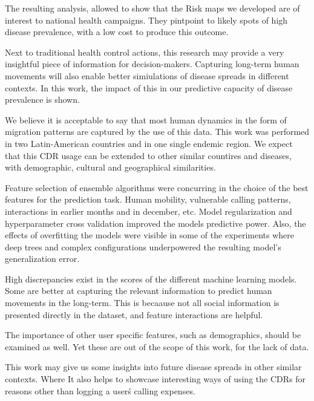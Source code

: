 

The resulting analysis, allowed to show that the Risk maps we developed are of interest to national health campaigns.
They pintpoint to likely spots of high disease prevalence, with a low cost to produce this outcome.

Next to traditional health control actions, this research may provide a very insightful piece of information for decision-makers.
Capturing long-term human movements will also enable better simiulations of disease spreads in different contexts.
In this work, the impact of this in our predictive capacity of disease prevalence is shown.





We believe it is acceptable to say that most human dynamics in the form of migration patterns are captured by the use of this data.
This work was performed in two Latin-American countries and in one single endemic region.
We expect that this CDR usage can be extended to other similar countires and diseases, with demographic, cultural and geographical similarities.


Feature selection of ensemble algorithms were concurring in the choice of the best features for the prediction task.
Human mobility, vulnerable calling patterns, interactions in earlier months and in december, etc.
Model regularization and hyperparameter cross validation improved the models predictive power.
Also, the effects of overfitting the models were visible in some of the experiments where deep trees and complex configurations underpowered the resulting model's generalization error.



High discrepancies exist in the scores of the different machine learning models.
Some are better at capturing the relevant information to predict human movements in the long-term.
This is becaause not all social information is presented directly in the dataset, and feature interactions are helpful.


The importance of other user specific features, such as demographics, should be examined as well.
Yet these are out of the scope of this work, for the lack of data.


This work may give us some insights into future disease spreads in other similar contexts.
Where
It also helps to showcase interesting ways of using the CDRs for reasons other than logging a user\'s calling expenses.


